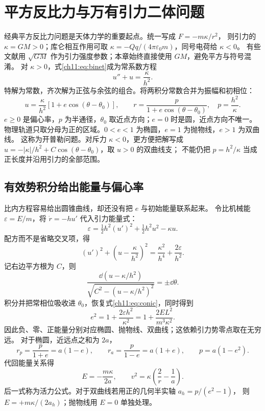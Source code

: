 \section{平方反比力与万有引力二体问题}
\label{ch11:sec:kepler}
经典平方反比力问题是天体力学的重要起点。统一写成 $F=-m\kappa/r^2$，
则引力的 $\kappa=GM>0$；库仑相互作用可取
$\kappa=-Qq/(4\pi\varepsilon_0m)$，同号电荷给 $\kappa<0$。
有些文献用 $\sqrt{GM}$ 作为引力强度参数；本章始终直接使用 $GM$，避免平方与符号混淆。
对 $\kappa>0$，式\eqref{ch11:eq:binet}成为常系数方程
\[
 u''+u=\frac{\kappa}{h^2}.
\]
特解为常数，齐次解为正弦与余弦的组合。将两积分常数合并为振幅和初相位：
\begin{equation}\label{ch11:eq:conic}
 u=\frac{\kappa}{h^2}[1+e\cos(\theta-\theta_0)],\qquad
 r=\frac{p}{1+e\cos(\theta-\theta_0)},\quad p=\frac{h^2}{\kappa}.
\end{equation}
$e\ge0$ 是偏心率，$p$ 为半通径，$\theta_0$ 取近点方向；$e=0$ 时是圆，近点方向不唯一。
物理轨道只取分母为正的区域。$0<e<1$ 为椭圆，$e=1$ 为抛物线，$e>1$ 为双曲线。
这称为开普勒问题。对斥力 $\kappa<0$，更方便把解写成
$u=-|\kappa|/h^2+C\cos(\theta-\theta_0)$，取 $u>0$ 的双曲线支；
不能仍把 $p=h^2/\kappa$ 当成正长度并沿用引力的全部范围。

\subsection{有效势积分给出能量与偏心率}
比内方程容易给出圆锥曲线，却还没有把 $e$ 与初始能量联系起来。
令比机械能 $\varepsilon=E/m$，将 $\dot r=-hu'$ 代入引力能量式：
\[
 \varepsilon=\tfrac12h^2(u')^2+\tfrac12h^2u^2-\kappa u.
\]
配方而不是省略交叉项，得
\[
 (u')^2+\left(u-\frac{\kappa}{h^2}\right)^2
 =\frac{\kappa^2}{h^4}+\frac{2\varepsilon}{h^2}.
\]
记右边平方根为 $C$，则
\[
 \frac{\dd(u-\kappa/h^2)}{\sqrt{C^2-(u-\kappa/h^2)^2}}=\pm\dd\theta.
\]
积分并把常相位吸收进 $\theta_0$，恢复式\eqref{ch11:eq:conic}，同时得到
\begin{equation}\label{ch11:eq:energy-eccentricity}
 e^2=1+\frac{2\varepsilon h^2}{\kappa^2}
     =1+\frac{2EL^2}{m^3\kappa^2}.
\end{equation}
因此负、零、正能量分别对应椭圆、抛物线、双曲线；这依赖引力势零点取在无穷远。
对于椭圆，近远点之和为 $2a$，
\[
 r_p=\frac p{1+e}=a(1-e),\qquad
 r_a=\frac p{1-e}=a(1+e),\qquad p=a(1-e^2).
\]
代回能量关系得
\begin{equation}\label{ch11:eq:vis-viva}
 E=-\frac{m\kappa}{2a},\qquad
 v^2=\kappa\left(\frac2r-\frac1a\right).
\end{equation}
后一式称为活力公式。对于双曲线若用正的几何半实轴 $a_h=p/(e^2-1)$，
则 $E=+m\kappa/(2a_h)$；抛物线用 $E=0$ 单独处理。


